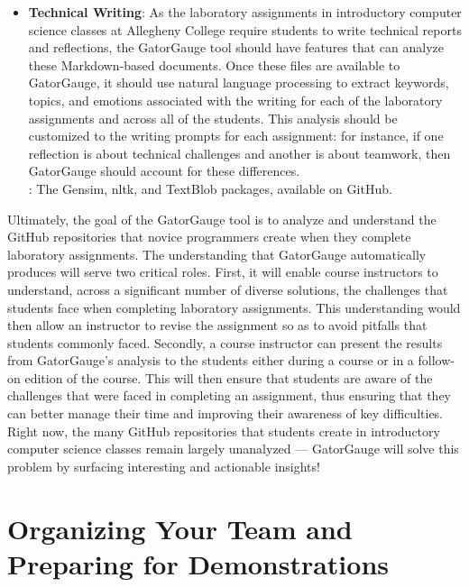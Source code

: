\documentclass[11pt]{article}
\begin{document}
\begin{itemize}
  \item {\bf Technical Writing}: As the laboratory assignments in introductory computer science classes at Allegheny
    College require students to write technical reports and reflections, the GatorGauge tool should have features that
    can analyze these Markdown-based documents. Once these files are available to GatorGauge, it should use natural
    language processing to extract keywords, topics, and emotions associated with the writing for each of the laboratory
    assignments and across all of the students. This analysis should be customized to the writing prompts for each
    assignment: for instance, if one reflection is about technical challenges and another is about teamwork, then
    GatorGauge should account for these differences. \\[.5em] : The Gensim, nltk, and
    TextBlob packages, available on GitHub.

\end{itemize}

Ultimately, the goal of the GatorGauge tool is to analyze and understand the GitHub repositories that novice programmers
create when they complete laboratory assignments. The understanding that GatorGauge automatically produces will serve
two critical roles. First, it will enable course instructors to understand, across a significant number of diverse
solutions, the challenges that students face when completing laboratory assignments. This understanding would then allow
an instructor to revise the assignment so as to avoid pitfalls that students commonly faced. Secondly, a course
instructor can present the results from GatorGauge's analysis to the students either during a course or in a follow-on
edition of the course. This will then ensure that students are aware of the challenges that were faced in completing an
assignment, thus ensuring that they can better manage their time and improving their awareness of key difficulties.
Right now, the many GitHub repositories that students create in introductory computer science classes remain largely
unanalyzed --- GatorGauge will solve this problem by surfacing interesting and actionable insights!

\section*{Organizing Your Team and Preparing for Demonstrations}
\end{document}
